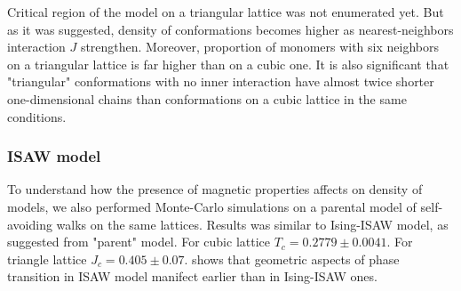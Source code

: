 \documentclass[a4paper]{jpconf}
\begin{document}
Critical region of the model on a triangular lattice was not enumerated yet. But as it was suggested, density of conformations becomes higher as nearest-neighbors interaction $J$ strengthen. Moreover, proportion of monomers with six neighbors on a triangular lattice is far higher than on a cubic one. It is also significant that "triangular" conformations with no inner interaction have almost twice shorter one-dimensional chains than conformations on a cubic lattice in the same conditions.

\subsubsection{ISAW model}

To understand how the presence of magnetic properties affects on density of models, we also performed Monte-Carlo simulations on a parental model of self-avoiding walks on the same lattices. Results was similar to Ising-ISAW model, as suggested from "parent" model. For cubic lattice $T_{c} = 0.2779\pm 0.0041 $\cite{Tesi1996}. For triangle lattice $J_{c} = 0.405 \pm 0.07 $\cite{Privman1986}.  shows that geometric aspects of phase transition in ISAW model manifect earlier than in Ising-ISAW ones.  
\end{document}
